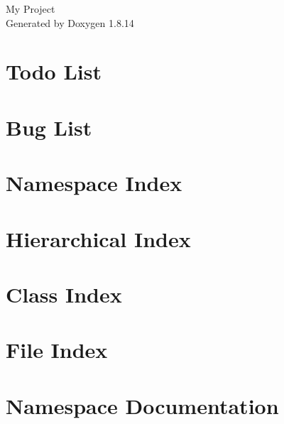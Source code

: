 \documentclass[twoside]{book}
\newcommand{\+}{\discretionary{\mbox{\scriptsize$\hookleftarrow$}}{}{}}
\newcommand{\clearemptydoublepage}{%
  \newpage{\pagestyle{empty}\cleardoublepage}%
}
\begin{document}
\hypersetup{pageanchor=false,
             bookmarksnumbered=true,
             pdfencoding=unicode
            }
\begin{titlepage}
\vspace*{7cm}
\begin{center}%
{\Large My Project }\\
\vspace*{1cm}
{\large Generated by Doxygen 1.8.14}\\
\end{center}
\end{titlepage}
\clearemptydoublepage
{}
\tableofcontents
\clearemptydoublepage
{}
\hypersetup{pageanchor=true}

\chapter{Todo List}
\label{todo}

\chapter{Bug List}
\label{bug}

\chapter{Namespace Index}

\chapter{Hierarchical Index}

\chapter{Class Index}

\chapter{File Index}

\chapter{Namespace Documentation}
















\end{document}
